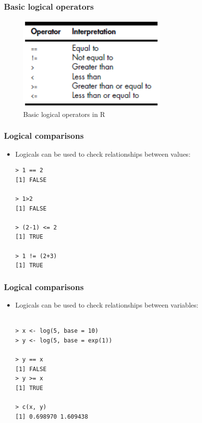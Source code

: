 \documentclass[xcolor=dvipsnames, xcolor=table]{beamer} %
\theoremstyle{mystyle}
\begin{document}
\begin{frame}[fragile] %
\frametitle{Basic logical operators}

\begin{figure}[H]
\includegraphics[width=7.5cm]{Screenshot_1}
\caption{Basic logical operators in R}
\end{figure}

\end{frame}



\begin{frame}[fragile] %

\frametitle{Logical comparisons}

\begin{itemize}
\item Logicals can be used to check relationships between values:
\begin{verbatim}
> 1 == 2
[1] FALSE

> 1>2
[1] FALSE

> (2-1) <= 2
[1] TRUE

> 1 != (2+3)
[1] TRUE

\end{verbatim}
\end{itemize}
\end{frame}

\begin{frame}[fragile] %

\frametitle{Logical comparisons}

\begin{itemize}
\item Logicals can be used to check relationships between variables:
\begin{verbatim}

> x <- log(5, base = 10)
> y <- log(5, base = exp(1))

> y == x
[1] FALSE
> y >= x
[1] TRUE

> c(x, y)
[1] 0.698970 1.609438

\end{verbatim}
\end{itemize}
\end{frame}
\end{document}
